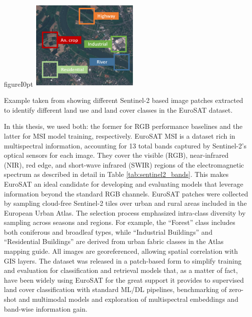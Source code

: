 \documentclass[a4paper, oneside, english]{sapthesis} %
\begin{document}
\begin{wrapfloat}{figure}{I}{0pt} %
    \includegraphics[width=0.4\textwidth]{img/EuroSAT_paper.png}
    \caption{Example taken from \cite{helber2019eurosat} showing different Sentinel-2 based image patches extracted to identify different land use and land cover classes in the EuroSAT dataset.}
    \vspace{-0.7cm}
\label{fig:eurosatpatch}
\end{wrapfloat}

In this thesis, we used both: the former for RGB performance baselines and the latter for MSI model training, respectively. EuroSAT MSI is a dataset rich in multispectral information, accounting for 13 total bands captured by Sentinel-2's optical sensors for each image. They cover the visible (RGB), near-infrared (NIR), red edge, and short-wave infrared (SWIR) regions of the electromagnetic spectrum as described in detail in Table \ref{tab:sentinel2_bands}. This makes EuroSAT an ideal candidate for developing and evaluating models that leverage information beyond the standard RGB channels.
EuroSAT patches were collected by sampling cloud-free Sentinel-2 tiles over urban and rural areas included in the European Urban Atlas. The selection process emphasized intra-class diversity by sampling across seasons and regions. For example, the “Forest” class includes both coniferous and broadleaf types, while “Industrial Buildings” and “Residential Buildings” are derived from urban fabric classes in the Atlas mapping guide. All images are georeferenced, allowing spatial correlation with GIS layers. The dataset was released in a patch-based form to simplify training and evaluation for classification and retrieval models that, as a matter of fact, have been widely using EuroSAT for the great support it provides to supervised land cover classification with standard ML/DL pipelines, benchmarking of zero-shot and multimodal models and exploration of multispectral embeddings and band-wise information gain.

\vspace{0.5cm}
\end{document}
